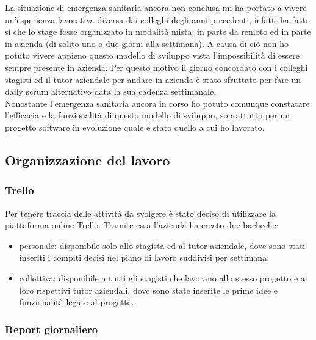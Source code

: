 La situazione di emergenza sanitaria ancora non conclusa mi ha portato a vivere un'esperienza lavorativa diversa dai colleghi degli anni precedenti, infatti ha fatto sì che lo stage fosse organizzato in modalità mista: in parte da remoto ed in parte in azienda (di solito uno o due giorni alla settimana). A causa di ciò non ho potuto vivere appieno questo modello di sviluppo vista l'impossibilità di essere sempre presente in azienda. Per questo motivo il giorno concordato con i colleghi stagisti ed il tutor aziendale per andare in azienda è stato sfruttato per fare un daily scrum alternativo data la sua cadenza settimanale.\\ 
Nonostante l'emergenza sanitaria ancora in corso ho potuto comunque constatare l’efficacia e la funzionalità di questo modello di sviluppo, soprattutto per un progetto software in evoluzione quale è stato quello a cui ho lavorato.\\

\subsection{Organizzazione del lavoro}

\subsubsection{Trello}

Per tenere traccia delle attività da svolgere è stato deciso di utilizzare la piattaforma online Trello. Tramite essa l'azienda ha creato due bacheche:
\begin{itemize}
	\item personale: disponibile solo allo stagista ed al tutor aziendale, dove sono stati inseriti i compiti decisi nel piano di lavoro suddivisi per settimana;
	\item collettiva: disponibile a tutti gli stagisti che lavorano allo stesso progetto e ai loro rispettivi tutor aziendali, dove sono state inserite le prime idee e funzionalità legate al progetto.
\end{itemize}

\subsubsection{Report giornaliero}

